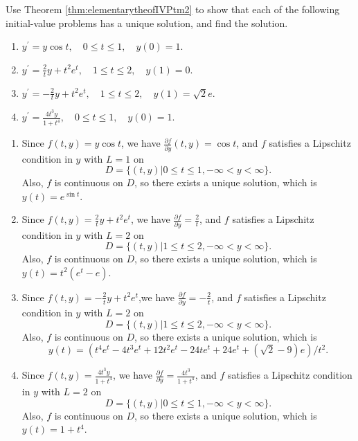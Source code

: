 \begin{myexercise}%
Use Theorem \ref{thm:elementarytheofIVPtm2} to show that each of the following initial-value problems has a unique solution, and find the solution.
\begin{enumerate}[label=(\alph*)]
\item $y^{\prime}=y \cos t, \quad 0 \leq t \leq 1, \quad y(0)=1$.\\
\item $y^{\prime}=\frac{2}{t} y+t^{2} e^{t}, \quad 1 \leq t \leq 2, \quad y(1)=0$.\\
\item $y^{\prime}=-\frac{2}{t} y+t^{2} e^{t}, \quad 1 \leq t \leq 2, \quad y(1)=\sqrt{2} e$.\\
\item $y^{\prime}=\frac{4 t^{3} y}{1+t^{4}}, \quad 0 \leq t \leq 1, \quad y(0)=1$.
\end{enumerate}

\begin{mysolution}
\begin{enumerate}[label=(\alph*)]
\item Since $f(t,y) = y\cos t$, we have $\frac{\partial f}{\partial y} (t,y) = \cos t$, and $f$ satisfies a Lipschitz condition in $y$ with $L = 1$ on
\[D=\{(t,y)|0\leq t\leq1,-\infty<y<\infty\}.\]
Also, $f$ is continuous on $D$, so there exists a unique solution, which is $y(t) = e^{\sin t}$.
\item Since $f(t,y) =\frac2t y +t^2e^t$, we have $\frac{\partial f}{\partial y} = \frac2t$, and $f$ satisfies a Lipschitz condition in $y$ with $L = 2$ on
\[D=\{(t,y)|1\leq t\leq2,-\infty<y<\infty\}.\]
 Also, $f$ is continuous on $D$, so there exists a unique solution, which is $y(t) = t^2(e^t-e)$.
\item Since $f(t,y) =-\frac2t y +t^2e^t$,we have $\frac{\partial f}{\partial y}=-\frac2t$, and $f$ satisfies a Lipschitz condition in $y$ with $L = 2$ on
\[D=\{(t,y)|1\leq t\leq2,-\infty<y<\infty\}.\]
Also, $f$ is continuous on $D$, so there exists a unique solution, which is
\[y(t) = (t^4e^t-4t^3e^t + 12t^2e^t-24te^t + 24e^t + (\sqrt{2}-9)e)/t^2.\]
\item Since $f(t,y) = \frac{4t^3y}{1 +t^4}$, we have $\frac{\partial f}{\partial y}=\frac{4t^3}{1 +t^4}$, and $f$ satisfies a Lipschitz condition in $y$ with $L = 2$ on
\[D=\{(t,y)|0\leq t\leq1,-\infty<y<\infty\}.\]
Also, $f$ is continuous on $D$, so there exists a unique solution, which is $y(t) = 1 + t^4$.
\end{enumerate}
\end{mysolution}
\end{myexercise}


